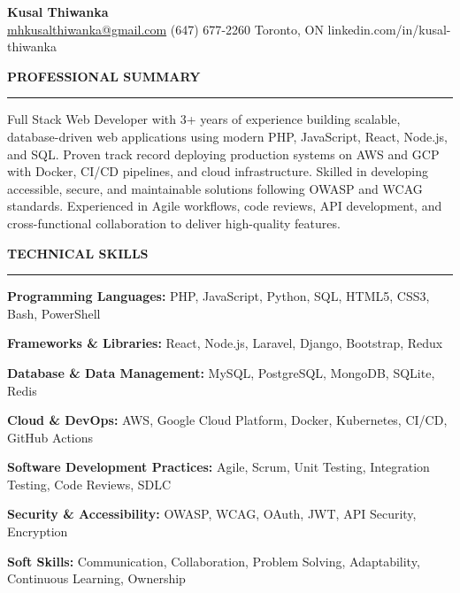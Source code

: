 \documentclass[10pt,letterpaper]{article}
\begin{document}
\begin{center}
{\LARGE\textbf{Kusal Thiwanka}}\\[3pt]
\href{mailto:mhkusalthiwanka@gmail.com}{mhkusalthiwanka@gmail.com}\hspace{2em}%
(647) 677{-}2260\hspace{2em}%
Toronto, ON\hspace{2em}
linkedin.com/in/kusal-thiwanka
\end{center}

\vspace{6pt}

\textbf{PROFESSIONAL SUMMARY}\\[-8pt]
\noindent\rule{\textwidth}{1pt}

\vspace{-2pt}

Full Stack Web Developer with 3+ years of experience building scalable, database-driven web applications using modern PHP, JavaScript, React, Node.js, and SQL. Proven track record deploying production systems on AWS and GCP with Docker, CI/CD pipelines, and cloud infrastructure. Skilled in developing accessible, secure, and maintainable solutions following OWASP and WCAG standards. Experienced in Agile workflows, code reviews, API development, and cross-functional collaboration to deliver high-quality features.

\vspace{8pt}

\textbf{TECHNICAL SKILLS}\\[-8pt]
\noindent\rule{\textwidth}{1pt}

\vspace{-2pt}

\textbf{Programming Languages:} PHP, JavaScript, Python, SQL, HTML5, CSS3, Bash, PowerShell

\textbf{Frameworks \& Libraries:} React, Node.js, Laravel, Django, Bootstrap, Redux

\textbf{Database \& Data Management:} MySQL, PostgreSQL, MongoDB, SQLite, Redis

\textbf{Cloud \& DevOps:} AWS, Google Cloud Platform, Docker, Kubernetes, CI/CD, GitHub Actions

\textbf{Software Development Practices:} Agile, Scrum, Unit Testing, Integration Testing, Code Reviews, SDLC

\textbf{Security \& Accessibility:} OWASP, WCAG, OAuth, JWT, API Security, Encryption

\textbf{Soft Skills:} Communication, Collaboration, Problem Solving, Adaptability, Continuous Learning, Ownership
\end{document}
